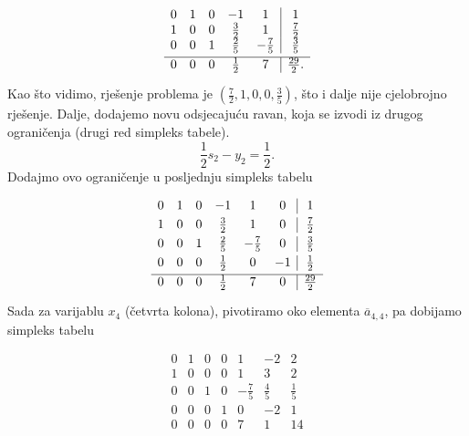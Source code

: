 \documentclass[a4paper, utf8, 11pt, colorlinks]{book}
\theoremstyle{definition}
\begin{document}
$$
\begin{array}{ccccc|c}
    0    &  1  &   0 &   -1  &            1 & 1                  \\
    1    &  0  &  0 &    \frac{3}{2}  &  1 & \frac{7}{2}\\ \vspace{1mm}
    0    &  0  &  1  &   \frac{2}{5}    &  -\frac{7}{5} & \frac{3}{5}  \\ \hline \vspace{1mm}
    0    &  0  &  0   &    \frac{1}{2}  &  7  &    \frac{29}{2}
.\end{array}
$$
Kao što vidimo, rješenje problema je $(\frac{7}{2}, 1, 0, 0, \frac{3}{5})$, što i dalje nije cjelobrojno rješenje. Dalje, dodajemo novu odsjecajuću ravan, koja se izvodi iz drugog ograničenja (drugi red simpleks tabele).
$$ \frac{1}{2} s_2 - y_2 = \frac{1}{2}.$$
Dodajmo ovo ograničenje u posljednju simpleks tabelu

$$
\begin{array}{cccccc|c}\vspace{1mm}
    0    &  1  &   0 &   -1  &            1 & 0 & 1                  \\\vspace{1mm}
    1    &  0  &  0 &    \frac{3}{2}    &  1 & 0 &  \frac{7}{2}\\ \vspace{1mm}
    0    &  0  &  1  &   \frac{2}{5}    &  -\frac{7}{5} &  0 & \frac{3}{5}  \\\vspace{1mm}
    0    & 0   &  0  &   \frac{1}{2}    & 0     & -1 & \frac{1}{2} \\ \hline\vspace{1mm} 
    0    &  0  &  0   &    \frac{1}{2}  &  7  &   0 &  \frac{29}{2}
\end{array}
$$
Sada za varijablu $x_4$ (četvrta kolona), pivotiramo oko elementa $\overline{a}_{4,4}$, pa dobijamo simpleks tabelu 

$$
\begin{array}{cccccc|c}
0 &  1   &  0  &  0  &    1             &    -2           &   2         \\
1 &  0   &  0  &  0  &    1             &     3           &   2         \\
0 &  0   &  1  &  0  &   -\frac{7}{5}   &     \frac{4}{5} &   \frac{1}{5}\\
0 &  0   &  0  &  1  &   0              &    -2           &   1   \\ \hline
0 &  0   &  0  &  0  &   7              &     1           &   14
\end{array}
$$
\end{document}
